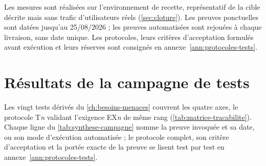 Les mesures sont réalisées sur l'environnement de recette, représentatif de la cible décrite mais
sans trafic d'utilisateurs réels (\cref{sec:cloture}). Les preuves ponctuelles sont datées jusqu'au
25/08/2026 ; les preuves automatisées sont rejouées à chaque livraison, sans date unique. Les
protocoles, leurs critères d'acceptation formulés avant exécution et leurs réserves sont consignés
en annexe~\ref{ann:protocoles-tests}.

\section{Résultats de la campagne de tests}
\label{sec:campagne}

Les vingt tests dérivés du \cref{ch:besoins-menaces} couvrent les quatre axes, le protocole T\emph{n} validant
l'exigence EX\emph{n} de même rang (\cref{tab:matrice-tracabilite}). Chaque ligne du
\cref{tab:synthese-campagne} nomme la preuve invoquée et sa date, ou son mode d'exécution
automatisée ; le protocole complet, son critère d'acceptation et la portée exacte de la preuve se
lisent test par test en annexe~\ref{ann:protocoles-tests}.


